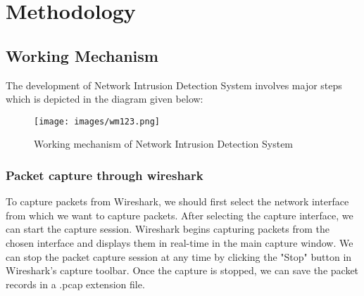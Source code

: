 \chapter{Methodology}
\section{Working Mechanism}
\vspace{-18pt}
The development of Network Intrusion Detection System involves major steps which is 
depicted in the diagram given below:
\begin{figure}[tbh] %
\begin{center}
	\texttt{[image: images/wm123.png]} 
	\caption{Working mechanism of Network Intrusion Detection System} %
	\label{Working mechanism of Network Intrusion Detection System} %
\end{center}
\end{figure}
\subsection{Packet capture through wireshark}
\vspace{-18pt}
To capture packets from Wireshark, we should first select the network interface from which we want to capture packets. After selecting the capture interface, we can start the capture session. Wireshark begins capturing packets from the chosen interface and displays them in real-time in the main capture window. We can stop the packet capture session at any time by clicking the "Stop" button in Wireshark's capture toolbar. Once the capture is stopped, we can save the packet records in a .pcap extension file.
